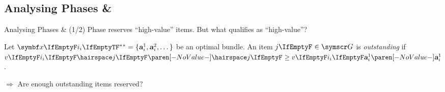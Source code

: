 \subsection{Analysing Phases \texorpdfstring{\phasei{} \& \phaseiii}{I \& III}}
\begin{frame}{Analysing Phases \phasei{} \& \phaseiii{} (1/2)}
	Phase \phasei{} reserves \enquote{high-value} items.
	But what qualifies as \enquote{high-value}?

	\begin{definition}
		Let \(\alloc* = \{ \asgd*{1}, \asgd*{2}, \dots\}\) be an optimal bundle.
		An item \(\genericitem \in \goods\) is \emph{outstanding} if \(\valuations[ \hairspace \genericitem] \ge \valuations[\asgd*{1}]\).
	\end{definition}

	\(\Rightarrow\) Are enough outstanding items reserved?
\end{frame}

